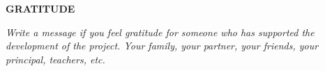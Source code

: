 \thispagestyle{fancy}

\begin{center}
    {\large\bfseries GRATITUDE}
\end{center}

\vspace{1cm}

\textit{Write a message if you feel gratitude for someone who has supported the development of the project. Your family, your partner, your friends, your principal, teachers, etc.}
